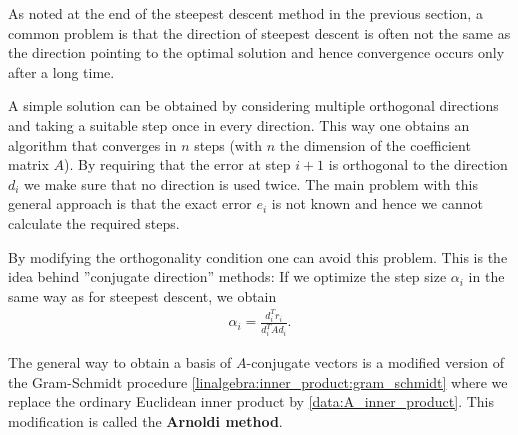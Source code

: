     As noted at the end of the steepest descent method in the previous section, a common problem is that the direction of steepest descent is often not the same as the direction pointing to the optimal solution and hence convergence occurs only after a long time.

    A simple solution can be obtained by considering multiple orthogonal directions and taking a suitable step once in every direction. This way one obtains an algorithm that converges in $n$ steps (with $n$ the dimension of the coefficient matrix $A$). By requiring that the error at step $i+1$ is orthogonal to the direction $d_i$ we make sure that no direction is used twice. The main problem with this general approach is that the exact error $e_i$ is not known and hence we cannot calculate the required steps.

    By modifying the orthogonality condition one can avoid this problem. This is the idea behind ''conjugate direction'' methods:
    If we optimize the step size $\alpha_i$ in the same way as for steepest descent, we obtain
    \begin{gather}
        \alpha_i = \frac{d_i^Tr_i}{d_i^TAd_i}.
    \end{gather}

    The general way to obtain a basis of $A$-conjugate vectors is a modified version of the Gram-Schmidt procedure \ref{linalgebra:inner_product:gram_schmidt} where we replace the ordinary Euclidean inner product by \ref{data:A_inner_product}. This modification is called the \textbf{Arnoldi method}.\label{Arnoldi iteration}

